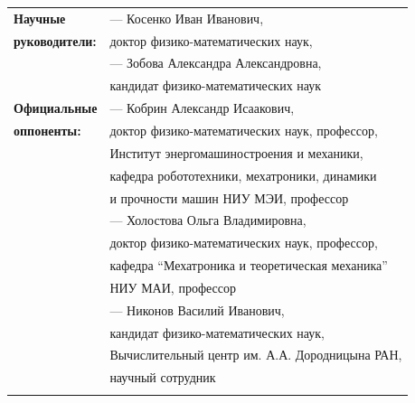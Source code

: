     \begin{tabular}{@{}p{5cm}p{16cm}}
        \textbf{Научные}               & --- Косенко Иван Иванович, \\
        \textbf{руководители:}         & доктор физико-математических наук,\\
                                       & --- Зобова Александра Александровна,\\
                                       & кандидат физико-математических наук
        \vspace{4mm} \\
        \textbf{Официальные}            & --- Кобрин Александр Исаакович, \\
        \textbf{оппоненты:}             & доктор физико-математических наук, профессор, \\
                                        & Институт энергомашиностроения и механики, \\
                                        & кафедра робототехники, мехатроники, динамики \\
                                        \vspace{4mm}
                                        & и прочности машин НИУ МЭИ, профессор \\
                                        & --- Холостова Ольга Владимировна, \\
                                        & доктор физико-математических наук, профессор, \\
                                        & кафедра ``Мехатроника и теоретическая механика'' \\
                                        \vspace{4mm}
                                        & НИУ МАИ, профессор \\
                                        & --- Никонов Василий Иванович, \\
                                        & кандидат физико-математических наук, \\
                                        & Вычислительный центр им. А.А. Дородницына РАН, \\
                                        & научный сотрудник\\
                                        \vspace{4mm}
    \end{tabular}  
\par\bigskip

